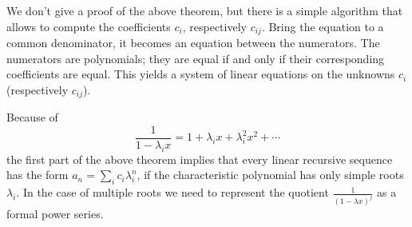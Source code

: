 

\setcounter{section}{2}
\setcounter{subsection}{3}
\setcounter{dfn}{12}


We don't give a proof of the above theorem, but there is a simple algorithm that allows to compute the coefficients $c_i$, respectively $c_{ij}$.
Bring the equation to a common denominator, it becomes an equation between the numerators.
The numerators are polynomials; they are equal if and only if their corresponding coefficients are equal.
This yields a system of linear equations on the unknowns $c_i$ (respectively $c_{ij}$).

Because of
\[
\frac{1}{1-\lambda_i x} = 1 + \lambda_i x + \lambda_i^2 x^2 + \cdots
\]
the first part of the above theorem implies that every linear recursive sequence has the form $a_n = \sum_i c_i \lambda_i^n$,
if the characteristic polynomial has only simple roots $\lambda_i$.
In the case of multiple roots we need to represent the quotient $\frac{1}{(1-\lambda x)^j}$ as a formal power series.




